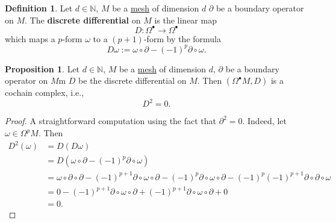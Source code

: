 \documentclass[fleqn]{article}
\theoremstyle{definition}
\newtheorem{proposition}[theorem]{Proposition}
\newtheorem{definition}[theorem]{Definition}
\newcommand{\N}{\mathbb{N}}
\begin{document}
\begin{definition}
  Let
    $d \in \N$,
    $M$ be a \hyperref[idec:mesh:definition]{mesh} of dimension $d$
    $\partial$ be a boundary operator on $M$.
  The \textbf{discrete differential} on $M$ is the linear map
  \begin{equation}
    D \colon \Omega^\bullet \to \Omega^\bullet
  \end{equation}
  which maps a $p$-form $\omega$ to a $(p + 1)$-form by the formula
  \begin{equation}
    D \omega := \omega \circ \partial - (-1)^p \partial \circ \omega.
  \end{equation}
\end{definition}

\begin{proposition}
  Let
    $d \in \N$,
    $M$ be a \hyperref[idec:mesh:definition]{mesh} of dimension $d$,
    $\partial$ be a boundary operator on $M$m
    $D$ be the discrete differential on $M$.
  Then $(\Omega^\bullet M, D)$ is a cochain complex, i.e.,
  \begin{equation}
    D^2 = 0.
  \end{equation}
\end{proposition}

\begin{proof}
  A straightforward computation using the fact that $\partial^2 = 0$.
  Indeed, let $\omega \in \Omega^p M$.
  Then
  \begin{equation}
    \begin{split}
      D^2(\omega)
      & = D(D \omega) \\
      & = D(\omega \circ \partial - (-1)^p \partial \circ \omega) \\
      & =
      \omega \circ \partial \circ \partial
        - (-1)^{p + 1} \partial \circ \omega \circ \partial
        - (-1)^p \partial \circ \omega \circ \partial
        - (-1)^p (-1)^{p + 1} \partial \circ \partial \circ \omega \\
      & =
      0 
      - (-1)^{p + 1}\partial \circ \omega \circ \partial
      + (-1)^{p + 1}\partial \circ \omega \circ \partial
      + 0 \\
      & = 0.
    \end{split}
  \end{equation}
\end{proof}
\end{document}
